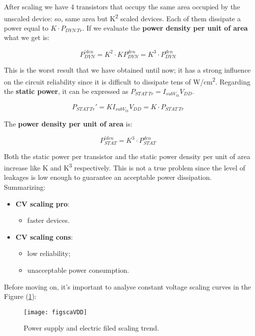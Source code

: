 \documentclass[a4paper, 12pt, twoside, openright]{report}
\newcommand{\super}{\textsuperscript}
\begin{document}
\begin{enumerate}
After scaling we have 4 transistors that occupy the same area occupied by the unscaled device: so, same area but K\super{2} scaled devices. Each of them dissipate a power equal to $K \cdot P_{DYN \ Tr}$. If we evaluate the \textbf{power density per unit of area} what we get is:

	\begin{equation}
	P^{'den}_{DYN} = K^2 \cdot KP_{DYN}^{den} = K^3 \cdot P^{den}_{DYN}
	\end{equation}

This is the worst result that we have obtained until now; it has a strong influence on the circuit reliability since it is difficult to dissipate tens of W/cm\super{2}.
Regarding the \textbf{static power}, it can be expressed as $P_{STAT \ Tr} = I_{subV_{th}} V_{DD}$.

	\begin{equation}
	P_{STAT \ Tr}' = K I_{subV_{th}} V_{DD} = K \cdot P_{STAT \ Tr}
	\end{equation}

The \textbf{power density per unit of area} is:

	\begin{equation}
	P^{'den}_{STAT} = K^3 \cdot P^{den}_{STAT}
	\end{equation}

Both the static power per transistor and the static power density per unit of area increase like K and K\super{3} respectively. This is not a true problem since the level of leakages is low enough to guarantee an acceptable power dissipation.
Summarizing:

\begin{itemize}
\item \textbf{CV scaling pro}:
	\begin{itemize}
	\item faster devices.
	\end{itemize}

\item \textbf{CV scaling cons}:
	\begin{itemize}
	\item low reliability;
	\item unacceptable power consumption.
	\end{itemize}
\end{itemize}

Before moving on, it's important to analyse constant voltage scaling curves in the Figure (\ref{curves}):

	\begin{figure}[H]
	\centering
	\texttt{[image: figscaVDD]}
	\caption{Power supply and electric filed scaling trend.}
	\label{curves}
	\end{figure}


\end{enumerate}
\end{document}
